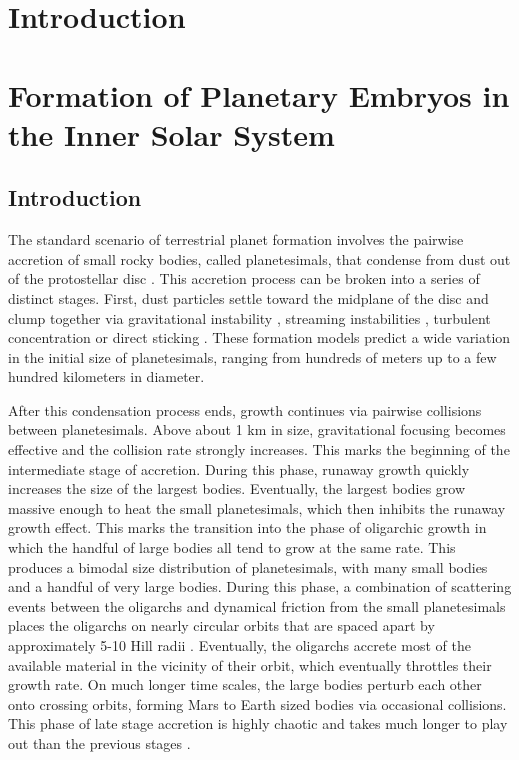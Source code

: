 \documentclass [11pt, proquest] {uwthesis}[2020/02/24]
\begin{document}
%
 
 
 
%
%

\textpages
 
\chapter {Introduction}

\chapter {Formation of Planetary Embryos in the Inner Solar System}

\section{Introduction} \label{sec:intro}

The standard scenario of terrestrial planet formation involves the pairwise accretion of small rocky bodies, called planetesimals, 
that condense from dust out of the protostellar disc \cite{safronov69}. This accretion process can be broken into a series of 
distinct stages. First, dust particles settle toward the midplane of the disc and clump together via gravitational instability 
\cite{goldreich73, youdin02}, streaming instabilities \cite{johansen07, johansen15}, turbulent concentration 
\cite{chambers10, cuzzi08, cuzzi10, hopkins16} or direct sticking \cite{okuzumi12, windmark12, garaud13, katoka13}. These 
formation models predict a wide variation in the initial size of planetesimals, ranging from hundreds of meters up to a few 
hundred kilometers in diameter.

After this condensation process ends, growth continues via pairwise collisions between planetesimals. Above about 1 km in size, 
gravitational focusing becomes effective and the collision rate strongly increases. This marks the beginning of the intermediate 
stage of accretion. During this phase, runaway growth \cite{duncan89, kokubo96, barnes09} quickly increases the size of the 
largest bodies. Eventually, the largest bodies grow massive enough to heat the small planetesimals, which then inhibits the 
runaway growth effect. This marks the transition into the phase of oligarchic growth in which the handful of large bodies all tend 
to grow at the same rate. This produces a bimodal size distribution of planetesimals, with many small bodies and a handful of 
very large bodies. During this phase, a combination of scattering events between the oligarchs and dynamical friction from the 
small planetesimals places the oligarchs on nearly circular orbits that are spaced apart by approximately 5-10 Hill radii 
\cite{kokubo98}. Eventually, the oligarchs accrete most of the available material in the vicinity of their orbit, which eventually 
throttles their growth rate. On much longer time scales, the large bodies perturb each other onto crossing orbits, forming Mars to 
Earth sized bodies via occasional collisions. This phase of late stage accretion is highly chaotic and takes much longer to play 
out than the previous stages \cite{chambers98, raymond06}.
\end{document}
